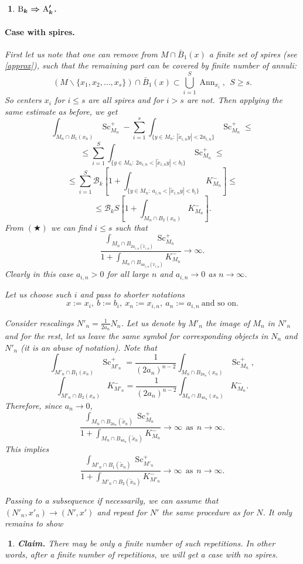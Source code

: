 \documentclass{article}
\def\cB{{\mathcal B}}
\def\ge{\geqslant}
\def\le{\leqslant}
\def\i{\subset}
\def\l{\left}
\def\r{\right}
\def\Sc{\operatorname{Sc}}
\newtheorem{Nothing}[thm]{$\!\!\!$}
\newenvironment{nothing}{\begin{Nothing}\rm}{\end{Nothing}}
\begin{document}
\begin{nothing}{\bf$\boldmath{\text{B}_{k} \Rightarrow\text{A}'_k}$.}
\paragraph*{Case with spires.}
First let us note that one can remove from $M\cap\bar B_1(x)$ a finite set of spires
(see \ref{approx}), such that the remaining part can be covered by finite number of annuli:
$$(M\backslash \{x_1,x_2,\dots,x_s\})\cap\bar B_1(x)\i\bigcup_{i=1}^S \operatorname{Ann}_{x_i},\ \  S\ge s.$$
So centers $x_i$ for $i\le s$ are all spires and for $i> s$ are not.
Then applying  the same estimate as before, we get
$$\int_{M_n\cap B_1(x_n)} \Sc^+_{M_n}-
\sum_{i=1}^s
\int_{\{y\in M_n:\ |\tilde x_{i,n}y|<2a_{i,n}\}} \Sc^+_{M_n}
\le$$
$$\le
\sum_{i=1}^S
\int_{\{y\in M_n:\ 2a_{i,n}<|\tilde x_{i,n}y|<b_i\}} \Sc^+_{M_n}\le $$
$$\le
\sum_{i=1}^S
\cB_k\l[1+\int_{\{y\in M_n:\ a_{i,n}<|\tilde x_{i,n}y|<b_i\}}K^-_{M_n}\r]\le $$
$$\le
\cB_k S\l[1+\int_{M_n\cap B_2(x_n)}K^-_{M_n}\r].
$$
From $(\bigstar)$ we can find $i\le s$ such that
$$\frac{\int_{M_n\cap B_{2a_{i,n}(\tilde x_{i,n})}}\Sc^+_{M_n}}
{1+\int_{M_n\cap B_{4a_{i,n}(\tilde x_{i,n})}}K^-_{M_n}}\to\infty.$$
Clearly in this case $a_{i,n}>0$ for all large $n$ and $a_{i,n}\to 0$ as $n\to\infty$.

Let us choose such $i$ and pass to shorter notations
$$x:=x_i,\ b :=b_i,\ x_n:=x_{i,n},\ a_n:=a_{i,n}\ \text{and so on}.$$

Consider rescalings $N'_n=\frac1{2a_n} N_n$.
Let us denote by $M'_n$ the image of $M_n$ in $N'_n$ and for the rest, let us leave the same symbol for corresponding objects in $N_n$ and $N'_n$ (it is an abuse of notation).
Note that
$$\int_{M'_n\cap B_1(x_n)}
\Sc^+_{M'_n}=\frac1{(2a_n)^{n-2}}\int_{M_n\cap B_{2a_{n}}(x_n)}\Sc^+_{M_{n}},$$
$$\int_{M'_n\cap B_2(x_n)}K^-_{M'_n}=\frac1{(2a_n)^{n-2}}\int_{M_n\cap B_{4a_{n}}(x_n)}K^-_{M_n}.$$
Therefore, since $a_n\to 0$,
$$\frac{\int_{M_n\cap B_{2a_n}(\tilde x_n)}\Sc^+_{M_n}}
{1+\int_{M_n\cap B_{4a_{n}}(\tilde x_n)}K^-_{M_n}}\to\infty\ \ \mbox{as}\ \ n\to\infty.$$
This implies
$$\frac{\int_{M'_n\cap B_{1}(\tilde x_{n})}\Sc^+_{M'_n}}
{1+\int_{M'_n\cap B_2(\tilde x_{n})}K^-_{M'_n}}\to\infty\ \ \mbox{as}\ \ n\to\infty.$$

Passing to a subsequence if necessarily, we can assume that $(N'_n,x'_n)\to (N',x')$ and repeat for $N'$ the same procedure as for $N$.
It only remains to show
\end{nothing}

\begin{Nothing}{\bf Claim.} There may be only a finite number of such repetitions.
In other words, after a finite number of repetitions, we will get a case with no spires.
\end{Nothing}
\end{document}
